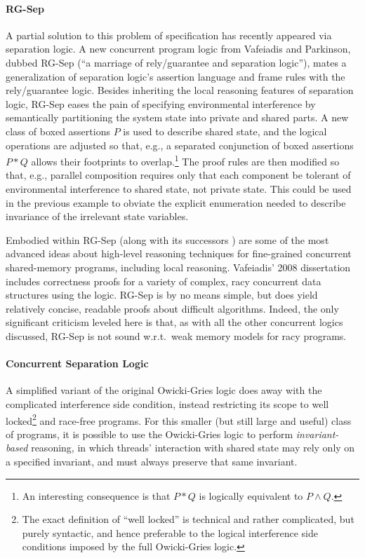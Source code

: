 \documentclass[11pt]{report}         %
\begin{document}
\paragraph{RG-Sep} A partial solution to this problem of specification has recently appeared via separation logic. A new concurrent program logic from Vafeiadis and Parkinson, dubbed RG-Sep \cite{DBLP:conf/concur/VafeiadisP07} (``a marriage of rely/guarantee and separation logic''), mates a generalization of separation logic's assertion language and frame rules with the rely/guarantee logic. Besides inheriting the local reasoning features of separation logic, RG-Sep eases the pain of specifying environmental interference by semantically partitioning the system state into private and shared parts. A new class of boxed assertions $\boxed{P}$ is used to describe shared state, and the logical operations are adjusted so that, e.g., a separated conjunction of boxed assertions $\boxed{P} * \boxed{Q}$ allows their footprints to overlap.\footnote{An interesting consequence is that $\boxed{P} * \boxed{Q}$ is logically equivalent to $\boxed{P \wedge Q}$.} The proof rules are then modified so that, e.g., parallel composition requires only that each component be tolerant of environmental interference to shared state, not private state. This could be used in the previous example to obviate the explicit enumeration needed to describe invariance of the irrelevant state variables.

Embodied within RG-Sep (along with its successors \cite{DBLP:conf/esop/DoddsFPV09}) are some of the most advanced ideas about high-level reasoning techniques for fine-grained concurrent shared-memory programs, including local reasoning. Vafeiadis' 2008 dissertation \cite{VafeiadisDissertation} includes correctness proofs for a variety of complex, racy concurrent data structures using the logic. RG-Sep is by no means simple, but does yield relatively concise, readable proofs about difficult algorithms. Indeed, the only significant criticism leveled here is that, as with all the other concurrent logics discussed, RG-Sep is not sound w.r.t.\ weak memory models for racy programs.

\paragraph{Concurrent Separation Logic} A simplified variant of the original Owicki-Gries logic does away with the complicated interference side condition, instead restricting its scope to well locked\footnote{The exact definition of ``well locked'' is technical and rather complicated, but purely syntactic, and hence preferable to the logical interference side conditions imposed by the full Owicki-Gries logic.} and race-free programs. For this smaller (but still large and useful) class of programs, it is possible to use the Owicki-Gries logic to perform \emph{invariant-based} reasoning, in which threads' interaction with shared state may rely only on a specified invariant, and must always preserve that same invariant.
\end{document}

